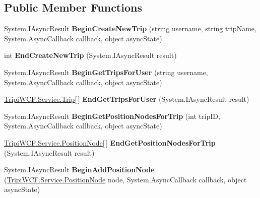 \subsection*{Public Member Functions}
\begin{DoxyCompactItemize}
\item 
\hypertarget{interface_i_trip_service_accdd4e0d4a074528f564f8966d309fe2}{
System.IAsyncResult {\bfseries BeginCreateNewTrip} (string username, string tripName, System.AsyncCallback callback, object asyncState)}
\label{interface_i_trip_service_accdd4e0d4a074528f564f8966d309fe2}

\item 
\hypertarget{interface_i_trip_service_a4ab63e3c4e872d664327bb05567a8f00}{
int {\bfseries EndCreateNewTrip} (System.IAsyncResult result)}
\label{interface_i_trip_service_a4ab63e3c4e872d664327bb05567a8f00}

\item 
\hypertarget{interface_i_trip_service_abdab35d0a03c32a7fcdb9b7e21840466}{
System.IAsyncResult {\bfseries BeginGetTripsForUser} (string username, System.AsyncCallback callback, object asyncState)}
\label{interface_i_trip_service_abdab35d0a03c32a7fcdb9b7e21840466}

\item 
\hypertarget{interface_i_trip_service_ad57b12311e0753b7f3b1c47f2da219eb}{
\hyperlink{class_tripi_w_c_f_1_1_service_1_1_trip}{TripiWCF.Service.Trip}\mbox{[}$\,$\mbox{]} {\bfseries EndGetTripsForUser} (System.IAsyncResult result)}
\label{interface_i_trip_service_ad57b12311e0753b7f3b1c47f2da219eb}

\item 
\hypertarget{interface_i_trip_service_af59f015a6ee2bcdae06759d153a0f87d}{
System.IAsyncResult {\bfseries BeginGetPositionNodesForTrip} (int tripID, System.AsyncCallback callback, object asyncState)}
\label{interface_i_trip_service_af59f015a6ee2bcdae06759d153a0f87d}

\item 
\hypertarget{interface_i_trip_service_a6f522a89afc016164069f8c983d6b637}{
\hyperlink{class_tripi_w_c_f_1_1_service_1_1_position_node}{TripiWCF.Service.PositionNode}\mbox{[}$\,$\mbox{]} {\bfseries EndGetPositionNodesForTrip} (System.IAsyncResult result)}
\label{interface_i_trip_service_a6f522a89afc016164069f8c983d6b637}

\item 
\hypertarget{interface_i_trip_service_a740f261ae2d3cdb5d57473f05d7403da}{
System.IAsyncResult {\bfseries BeginAddPositionNode} (\hyperlink{class_tripi_w_c_f_1_1_service_1_1_position_node}{TripiWCF.Service.PositionNode} node, System.AsyncCallback callback, object asyncState)}
\label{interface_i_trip_service_a740f261ae2d3cdb5d57473f05d7403da}


\end{DoxyCompactItemize}
